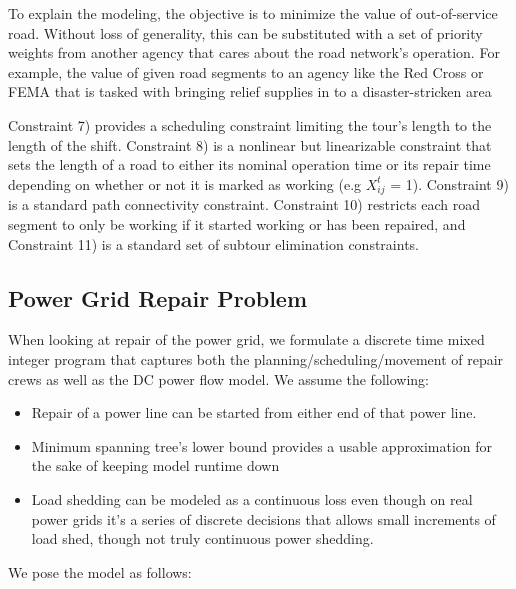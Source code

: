\documentclass{article}
\begin{document}
To explain the modeling, the objective is to minimize the value of out-of-service road. Without loss of generality, this can be substituted with a set of priority weights from another agency that cares about the road network's operation. For example, the value of given road segments to an agency like the Red Cross or FEMA that is tasked with bringing relief supplies in to a disaster-stricken area

Constraint 7) provides a scheduling constraint limiting the tour's length to the length of the shift. Constraint 8) is a nonlinear but linearizable constraint that sets the length of a road to either its nominal operation time or its repair time depending on whether or not it is marked as working (e.g $X_{ij}^t$ = 1). Constraint 9) is a standard path connectivity constraint. Constraint 10) restricts each road segment to only be working if it started working or has been repaired, and Constraint 11) is a standard set of subtour elimination constraints.
	\subsection{Power Grid Repair Problem}
	When looking at repair of the power grid, we formulate a discrete time mixed integer program that captures both the planning/scheduling/movement of repair crews as well as the DC power flow model. We assume the following:
	\begin{itemize}
		\item Repair of a power line can be started from either end of that power line.
		\item Minimum spanning tree's lower bound provides a usable approximation for the sake of keeping model runtime down 
		\item Load shedding can be modeled as a continuous loss even though on real power grids it's a series of discrete decisions that allows small increments of load shed, though not truly continuous power shedding.
	\end{itemize}
	We pose the model as follows:
\end{document}
